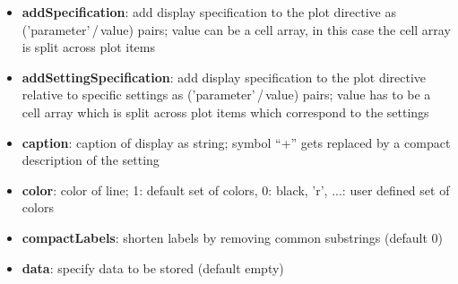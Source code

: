\documentclass[a4paper,fleqn]{tufte-handout}
\begin{document}
\begin{itemize}
\item \textbf{addSpecification}: add display specification to the plot directive
    	as ('parameter'\,/\,value) pairs;
           value can be a cell array, in this case the cell array is split
           across plot items                 
\item \textbf{addSettingSpecification}:  add display specification to the plot
           directive relative to specific settings as ('parameter'\,/\,value) pairs;
           value has to be a cell array which is split
           across plot items which correspond to the settings                
\item \textbf{caption}: caption of display as string;
    	symbol ``+'' gets replaced by a compact description of the setting  
\item \textbf{color}: color of line;
           1: default set of colors,
           0: black,
           {'r', ...}: user defined set of colors                 
\item \textbf{compactLabels}: shorten labels by removing common substrings
           (default 0)                 
\item \textbf{data}: specify data to be stored (default empty)  


\end{itemize}
\end{document}
